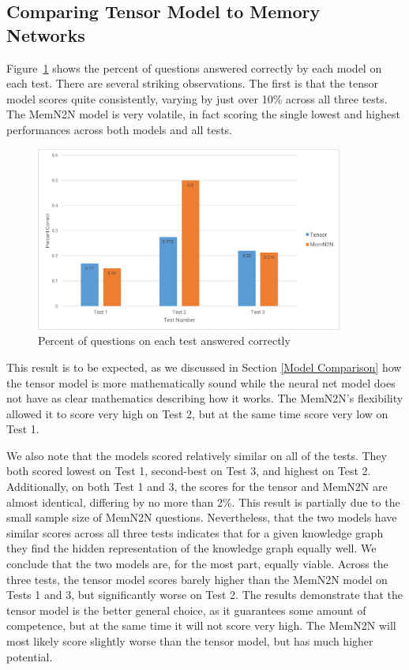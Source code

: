 \documentclass[pageno]{final_paper}
\begin{document}
\subsection{Comparing Tensor Model to Memory Networks}
\label{Comparing Tensor Model to Memory Networks}

Figure~\ref{fig: qa_by_test} shows the percent of questions answered correctly
by each model on each test. There are several striking observations. The first
is that the tensor model scores quite consistently, varying by just over 10\%
across all three tests. The MemN2N model is very volatile, in fact scoring the
single lowest and highest performances across both models and all tests.

\begin{figure}[!tb]
    \centering
    \includegraphics[width=0.9\textwidth,keepaspectratio]{figures/qa_by_test.png}
    \caption{Percent of questions on each test answered correctly}
    \label{fig: qa_by_test}
\end{figure}

This result is to be expected, as we discussed in Section \ref{Model Comparison}
how the tensor model is more mathematically sound while the neural net model
does not have as clear mathematics describing how it works. The MemN2N's
flexibility allowed it to score very high on Test 2, but at the same time score
very low on Test 1.

We also note that the models scored relatively similar on all of the tests. They
both scored lowest on Test 1, second-best on Test 3, and highest on Test 2.
Additionally, on both Test 1 and 3, the scores for the tensor and MemN2N are
almost identical, differing by no more than 2\%. This result is partially due to
the small sample size of MemN2N questions. Nevertheless, that the two models
have similar scores across all three tests indicates that for a given knowledge
graph they find the hidden representation of the knowledge graph equally well.
We conclude that the two models are, for the most part, equally viable. Across
the three tests, the tensor model scores barely higher than the MemN2N model on
Tests 1 and 3, but significantly worse on Test 2. The results demonstrate that
the tensor model is the better general choice, as it guarantees some amount of
competence, but at the same time it will not score very high. The MemN2N will
most likely score slightly worse than the tensor model, but has much higher
potential.
\end{document}
